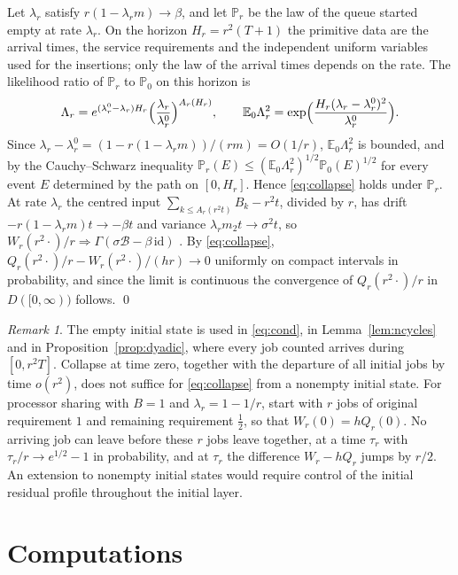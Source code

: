 \documentclass[11pt]{amsart}
\theoremstyle{remark}
\newtheorem{remark}[theorem]{Remark}
\numberwithin{equation}{section}
\newcommand{\E}{\mathbb E}
\newcommand{\Pp}{\mathbb P}
\newcommand{\1}{\mathbf 1}
\begin{document}
Let $\lambda_r$ satisfy $r(1-\lambda_rm)\to\beta$, and let $\Pp_r$ be the law of the queue started empty at rate $\lambda_r$. On the horizon $H_r=r^2(T+1)$ the primitive data are the arrival times, the service requirements and the independent uniform variables used for the insertions; only the law of the arrival times depends on the rate. The likelihood ratio of $\Pp_r$ to $\Pp_0$ on this horizon is
\[
\Lambda_r=e^{(\lambda^0_r-\lambda_r)H_r}\Bigl(\frac{\lambda_r}{\lambda^0_r}\Bigr)^{A_r(H_r)},\qquad\E_0\Lambda_r^2=\exp\Bigl(\frac{H_r(\lambda_r-\lambda_r^0)^2}{\lambda_r^0}\Bigr).
\]
Since $\lambda_r-\lambda^0_r=(1-r(1-\lambda_rm))/(rm)=O(1/r)$, $\E_0\Lambda^2_r$ is bounded, and by the Cauchy--Schwarz inequality $\Pp_r(E)\le(\E_0\Lambda_r^2)^{1/2}\Pp_0(E)^{1/2}$ for every event $E$ determined by the path on $[0,H_r]$. Hence \eqref{eq:collapse} holds under $\Pp_r$. At rate $\lambda_r$ the centred input $\sum_{k\le A_r(r^2t)}B_k-r^2t$, divided by $r$, has drift $-r(1-\lambda_rm)t\to-\beta t$ and variance $\lambda_rm_2t\to\sigma^2t$, so $W_r(r^2\cdot)/r\Rightarrow\Gamma(\sigma\mathcal B-\beta\,\mathrm{id})$ \cite{Whi}. By \eqref{eq:collapse}, $Q_r(r^2\cdot)/r-W_r(r^2\cdot)/(hr)\to0$ uniformly on compact intervals in probability, and since the limit is continuous the convergence of $Q_r(r^2\cdot)/r$ in $D([0,\infty))$ follows. \qed

\begin{remark}
The empty initial state is used in \eqref{eq:cond}, in Lemma~\ref{lem:ncycles} and in Proposition~\ref{prop:dyadic}, where every job counted arrives during $[0,r^2T]$. Collapse at time zero, together with the departure of all initial jobs by time $o(r^2)$, does not suffice for \eqref{eq:collapse} from a nonempty initial state. For processor sharing with $B=1$ and $\lambda_r=1-1/r$, start with $r$ jobs of original requirement $1$ and remaining requirement $\frac12$, so that $W_r(0)=hQ_r(0)$. No arriving job can leave before these $r$ jobs leave together, at a time $\tau_r$ with $\tau_r/r\to e^{1/2}-1$ in probability, and at $\tau_r$ the difference $W_r-hQ_r$ jumps by $r/2$. An extension to nonempty initial states would require control of the initial residual profile throughout the initial layer.
\end{remark}

\section{Computations}\label{sec:numerics}
\end{document}
